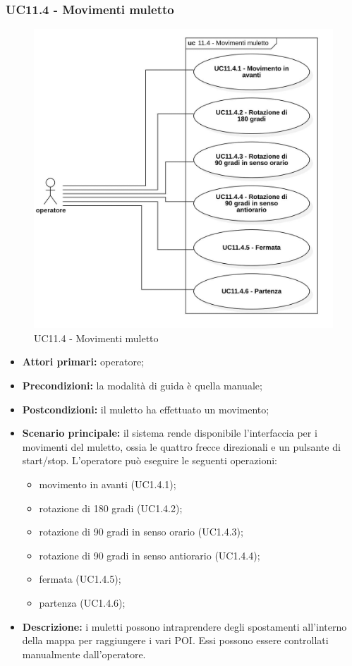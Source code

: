\subsubsection{UC11.4 - Movimenti muletto}

\begin{figure}[H]
	\centering
	\includegraphics[scale=0.52]{res/images/uc11-4.png}
	\caption{UC11.4 - Movimenti muletto}
\end{figure}

\begin{itemize}
	\item 	\textbf{Attori primari:} operatore;
	\item 	\textbf{Precondizioni:} la modalità di guida è quella manuale;
	\item 	\textbf{Postcondizioni:} il muletto ha effettuato un movimento;
	\item 	\textbf{Scenario principale:} il sistema rende disponibile l'interfaccia per i movimenti del muletto, ossia le quattro frecce direzionali e un pulsante di start/stop. L'operatore può eseguire le seguenti operazioni:
	\begin{itemize}
		\item movimento in avanti (UC1.4.1); 
		\item rotazione di 180 gradi (UC1.4.2);
		\item rotazione di 90 gradi in senso orario (UC1.4.3);
		\item rotazione di 90 gradi in senso antiorario (UC1.4.4);
		\item fermata (UC1.4.5);
		\item partenza (UC1.4.6);
	\end{itemize}
	\item 	\textbf{Descrizione:} i muletti possono intraprendere degli spostamenti all'interno della mappa per raggiungere i vari POI. Essi possono essere controllati manualmente dall'operatore.
\end{itemize}


